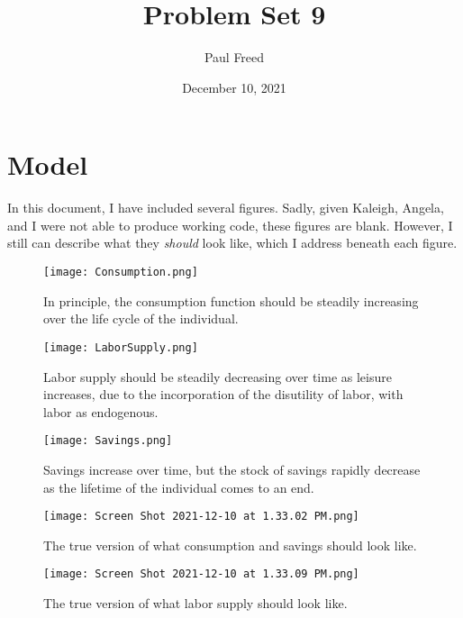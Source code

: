 \documentclass{article}[12pt]
\begin{document}
\title{Problem Set 9}
\author{Paul Freed}
\date{December 10, 2021}

\maketitle

\section*{Model}
In this document, I have included several figures. Sadly, given Kaleigh, Angela, and I were not able to produce working code, these figures are blank. However, I still can describe what they \textit{should} look like, which I address beneath each figure.  


\begin{figure}[b]
\centering
\texttt{[image: Consumption.png]}
\caption{\label{fig:frog} In principle, the consumption function should be steadily increasing over the life cycle of the individual. }
\end{figure}

\begin{figure}[!]
\centering
\texttt{[image: LaborSupply.png]}
\caption{\label{fig:frog} Labor supply should be steadily decreasing over time as leisure increases, due to the incorporation of the disutility of labor, with labor as endogenous.}
\end{figure}


\pagebreak
\begin{figure}[!]
\centering
\texttt{[image: Savings.png]}
\caption{\label{fig:frog} Savings increase over time, but the stock of savings rapidly decrease as the lifetime of the individual comes to an end.}
\end{figure}

\pagebreak
\begin{figure}[!]
\centering
\texttt{[image: Screen Shot 2021-12-10 at 1.33.02 PM.png]}
\caption{\label{fig:frog} The true version of what consumption and savings should look like.}
\end{figure}

\pagebreak
\begin{figure}[!]
\centering
\texttt{[image: Screen Shot 2021-12-10 at 1.33.09 PM.png]}
\caption{\label{fig:frog} The true version of what labor supply should look like.}
\end{figure}
\end{document}
